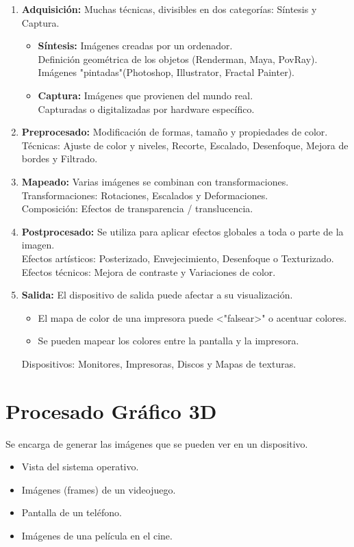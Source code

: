 \begin{enumerate}
	\item \textbf{Adquisición:} Muchas técnicas, divisibles en dos categorías: Síntesis y Captura.
	      \begin{itemize}
		      \item \textbf{Síntesis:} Imágenes creadas por un ordenador. \\ Definición geométrica de los objetos (Renderman, Maya, PovRay). \\ Imágenes "pintadas"(Photoshop, Illustrator, Fractal Painter).
		      \item \textbf{Captura:} Imágenes que provienen del mundo real. \\ Capturadas o digitalizadas por hardware específico.
	      \end{itemize}
	\item \textbf{Preprocesado:} Modificación de formas, tamaño y propiedades de color. \\ Técnicas: Ajuste de color y niveles, Recorte, Escalado, Desenfoque, Mejora de bordes y Filtrado.
	\item \textbf{Mapeado:} Varias imágenes se combinan con transformaciones. \\ Transformaciones: Rotaciones, Escalados y Deformaciones. \\ Composición: Efectos de transparencia / translucencia.
	\item \textbf{Postprocesado:} Se utiliza para aplicar efectos globales a toda o parte de la imagen. \\ Efectos artísticos: Posterizado, Envejecimiento, Desenfoque  o Texturizado. \\ Efectos técnicos: Mejora de contraste y Variaciones de color.
	\item \textbf{Salida:} El dispositivo de salida puede afectar a su visualización.
	      \begin{itemize}
		      \item El mapa de color de una impresora puede <"falsear>" o acentuar colores.
		      \item Se pueden mapear los colores entre la pantalla y la impresora.
	      \end{itemize}
	      Dispositivos: Monitores, Impresoras, Discos y Mapas de texturas.
\end{enumerate}

\section{Procesado Gráfico 3D}\label{sec:procesado-gráfico-3d}
Se encarga de generar las imágenes que se pueden ver en un dispositivo.
\begin{itemize}
	\item Vista del sistema operativo.
	\item Imágenes (frames) de un videojuego.
	\item Pantalla de un teléfono.
	\item Imágenes de una película en el cine.
\end{itemize}
